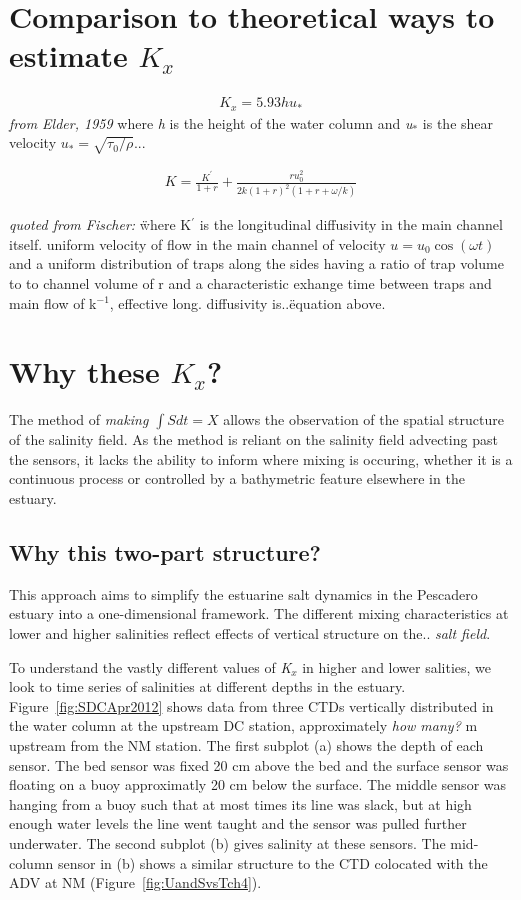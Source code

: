 \section{Comparison to theoretical ways to estimate $K_x$}

\begin{eqnarray}
K_x = 5.93hu_* \label{eq:Kshear}
\end{eqnarray}
\emph{from Elder, 1959} where \emph{h} is the height of the water column and \emph{u$_*$} is the shear velocity $u_*=\sqrt{\tau_0/\rho}$... 


\begin{eqnarray}
K = \frac{K^{'}}{1+r} + \frac{ru_0^2}{2k(1+r)^2(1+r+\omega / k)} \label{eq:KxOkubo}
\end{eqnarray}

\emph{quoted from Fischer:} \"where K$^{'}$ is the longitudinal diffusivity in the main channel itself. uniform velocity of flow in the main channel of velocity $u = u_0 \cos(\omega t)$ and a uniform distribution of traps along the sides having a ratio of trap volume to to channel volume of r and a characteristic exhange time between traps and main flow of k$^{-1}$, effective long. diffusivity is..\" equation above. 


\section{Why these $K_x$?}

The method of \emph{making $\int{S}dt = X$} allows the observation of the spatial structure of the salinity field.  As the method is reliant on the salinity field advecting past the sensors, it lacks the ability to inform where mixing is occuring, whether it is a continuous process or controlled by a bathymetric feature elsewhere in the estuary. 

\subsection{Why this two-part structure?}

This approach aims to simplify the estuarine salt dynamics in the Pescadero estuary into a one-dimensional framework. The different mixing characteristics at lower and higher salinities reflect effects of vertical structure on the.. \emph{salt field}. 

To understand the vastly different values of \emph{K$_x$} in higher and lower salities, we look to time series of salinities at different depths in the estuary. Figure~\ref{fig:SDCApr2012} shows data from three CTDs vertically distributed in the water column at the upstream DC station, approximately \emph{how many?} m upstream from the NM station. The first subplot (a) shows the depth of each sensor. The bed sensor was fixed 20 cm above the bed and the surface sensor was floating on a buoy approximatly 20 cm below the surface. The middle sensor was hanging from a buoy such that at most times its line was slack, but at high enough water levels the line went taught and the sensor was pulled further underwater. The second subplot (b) gives salinity at these sensors. The mid-column sensor in (b) shows a similar structure to the CTD colocated with the ADV at NM (Figure~\ref{fig:UandSvsTch4}).

